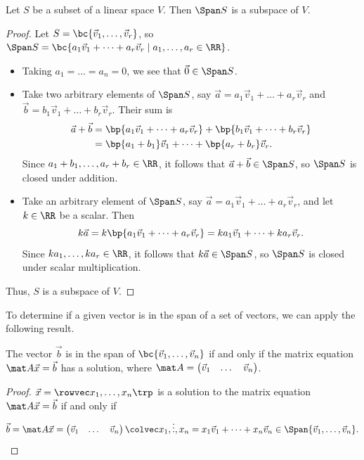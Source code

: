 \begin{proposition}
    Let $S$ be a subset of a linear space $V$. Then $\Span S$ is a subspace of $V$.
\end{proposition}
\begin{proof}
    Let $S = \bc{\vec v_1, \dots, \vec v_r}$, so $\Span S = \bc{a_1 \vec v_1 + \dots + a_r \vec v_r \mid a_1, \dots, a_r \in \RR}$.
    \begin{itemize}
        \item Taking $a_1 = \dots = a_n = 0$, we see that $\vec 0 \in \Span S$.
        \item Take two arbitrary elements of $\Span S$, say $\vec a = a_1 \vec v_1 + \dots + a_r \vec v_r$ and $\vec b = b_1 \vec v_1 + \dots + b_r \vec v_r$. Their sum is
        \begin{align*}
            \vec a + \vec b &= \bp{a_1 \vec v_1 + \dots + a_r \vec v_r} + \bp{b_1 \vec v_1 + \dots + b_r \vec v_r}\\
            &= \bp{a_1 + b_1} \vec v_1 + \dots + \bp{a_r + b_r} \vec v_r.
        \end{align*}
        Since $a_1 + b_1, \dots, a_r + b_r \in \RR$, it follows that $\vec a + \vec b \in \Span S$, so $\Span S$ is closed under addition.
        \item Take an arbitrary element of $\Span S$, say $\vec a = a_1 \vec v_1 + \dots + a_r \vec v_r$, and let $k \in \RR$ be a scalar. Then \[k \vec a = k \bp{a_1 \vec v_1 + \dots + a_r \vec v_r} = ka_1 \vec v_1 + \dots + ka_r \vec v_r.\] Since $ka_1, \dots, ka_r \in \RR$, it follows that $k\vec a \in \Span S$, so $\Span S$ is closed under scalar multiplication.
    \end{itemize}
    Thus, $S$ is a subspace of $V$.
\end{proof}

To determine if a given vector is in the span of a set of vectors, we can apply the following result.

\begin{proposition}\label{prop:lin-alg-col-span}
    The vector $\vec b$ is in the span of $\bc{\vec v_1, \dots, \vec v_n}$ if and only if the matrix equation $\mat A \vec x = \vec b$ has a solution, where $\mat A = \begin{pmatrix}\vec v_1 & \dots & \vec v_n\end{pmatrix}$.
\end{proposition}
\begin{proof}
    $\vec x = \cveciiix{x_1}{\dots}{x_n}$ is a solution to the matrix equation $\mat A \vec x = \vec b$ if and only if \[\vec b = \mat A \vec x = \begin{pmatrix}\vec v_1 & \dots & \vec v_n \end{pmatrix} \cveciii{x_1}{\vdots}{x_n} = x_1 \vec v_1 + \dots + x_n \vec v_n \in \Span{\vec v_1, \dots, \vec v_n}.\]
\end{proof}

